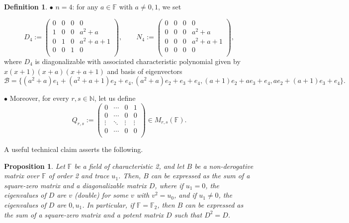 \documentclass{amsart}
\def\FF{\mathbb{F}}
\newtheorem{proposition}[theorem]{Proposition}
\theoremstyle{definition}
\newtheorem{definition}[theorem]{Definition}
\theoremstyle{remark}
\numberwithin{equation}{section}
\begin{document}
\begin{definition}
\medskip

\noindent $\bullet$ $n=4$: for any $a\in \FF$ with $a\ne 0,1$, we set

$$D_{4}:=\left(
           \begin{array}{cccc}
             0 & 0 & 0 & 0 \\
             1 & 0 & 0 & a^2+a \\
             0 & 1 & 0 & a^2+a+1 \\
             0 & 0 & 1 & 0 \\
           \end{array}
         \right),\qquad N_{4}:=\left(
           \begin{array}{cccc}
             0 & 0 & 0 & 0 \\
             0 & 0 & 0 & a^2+a \\
             0 & 0 & 0 & a^2+a+1 \\
             0 & 0 & 0 & 0 \\
           \end{array}
         \right),$$
where $D_4$ is diagonalizable with associated characteristic polynomial given by $x(x+1)(x+a)(x+a+1)$ and basis of eigenvectors
$$
\mathcal{B}=\{(a^2+a)e_1+(a^2+a+1)e_2+e_4, (a^2+a)e_2+e_3+e_4, (a+1)e_2+ae_3+e_4, ae_2+(a+1)e_3+e_4\}.
$$

\medskip

\noindent $\bullet$ Moreover, for every $r,s\in \mathbb{N}$, let us define
$$Q_{r,s}:=\left(
            \begin{array}{cccc}
              0 & \cdots & 0 & 1 \\
              0 & \cdots  & 0 & 0 \\
              \vdots & \ddots  & \vdots & \vdots \\
              0 &  \cdots & 0 & 0 \\
            \end{array}
          \right)\in M_{r,s}(\mathbb{F}).$$
\end{definition}

A useful technical claim asserts the following.

\begin{proposition}\label{case2}
Let $\FF$ be a field of characteristic 2, and let $B$ be a non-derogative matrix over $\FF$ of order 2 and trace $u_1$. Then, $B$ can be expressed as the sum of a square-zero matrix and a diagonalizable matrix $D$, where if $u_1=0$, the eigenvalues of $D$ are $v$ (double) for some $v$ with $v^2=u_0$, and if $u_1\ne 0$, the eigenvalues of $D$ are $0, u_1$. In particular, if $\FF=\FF_2$, then $B$ can be expressed as the sum of a square-zero matrix and a potent matrix $D$ such that $D^2=D$.
\end{proposition}
\end{document}
